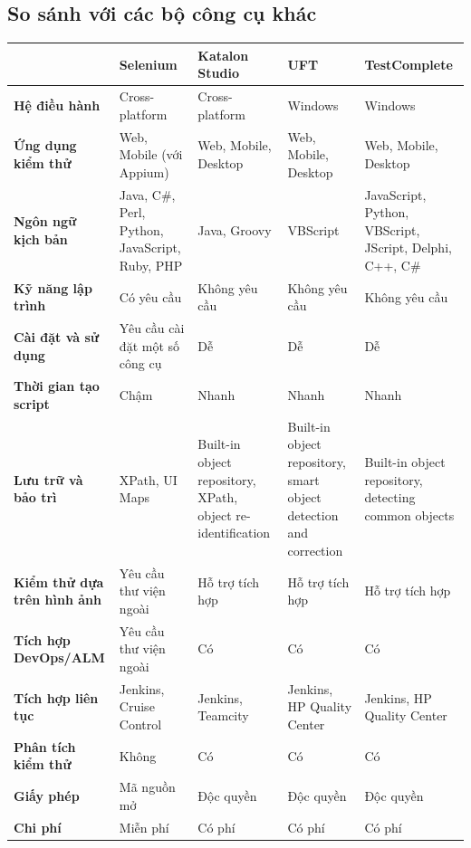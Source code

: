 \documentclass[./../main_file.tex]{subfiles}
\begin{document}
	\subsection{So sánh với các bộ công cụ khác}
	
	\begin{table}[H]
		\begin{tabular}{p{}p{}p{}p{}p{}}
			\hline
			\multicolumn{1}{l}{} & \textbf{Selenium} & \textbf{Katalon Studio} & \textbf{UFT} & \textbf{TestComplete} \\ \hline
			\textbf{Hệ điều hành} & Cross-platform & Cross-platform & Windows & Windows \\
			\textbf{Ứng dụng kiểm thử} & Web, Mobile (với Appium) & Web, Mobile, Desktop & Web, Mobile, Desktop & Web, Mobile, Desktop \\
			\textbf{Ngôn ngữ kịch bản} & Java, C\#, Perl, Python, JavaScript, Ruby, PHP & Java, Groovy & VBScript & JavaScript, Python, VBScript, JScript, Delphi, C++, C\# \\
			\textbf{Kỹ năng lập trình} & Có yêu cầu & Không yêu cầu & Không yêu cầu & Không yêu cầu \\
			\textbf{Cài đặt và sử dụng} & Yêu cầu cài đặt một số công cụ & Dễ & Dễ & Dễ \\
			\textbf{Thời gian tạo script} & Chậm & Nhanh & Nhanh & Nhanh \\
			\textbf{Lưu trữ và bảo trì} & XPath, UI Maps & Built-in object repository, XPath, object re-identification & Built-in object repository, smart object detection and correction & Built-in object repository, detecting common objects \\
			\textbf{Kiểm thử dựa trên hình ảnh} & Yêu cầu thư viện ngoài & Hỗ trợ tích hợp & Hỗ trợ tích hợp & Hỗ trợ tích hợp \\
			\textbf{Tích hợp DevOps/ALM} & Yêu cầu thư viện ngoài & Có & Có & Có \\
			\textbf{Tích hợp liên tục} & Jenkins, Cruise Control & Jenkins, Teamcity & Jenkins, HP Quality Center & Jenkins, HP Quality Center \\
			\textbf{Phân tích kiểm thử} & Không & Có & Có & Có \\
			\textbf{Giấy phép} & Mã nguồn mở & Độc quyền & Độc quyền & Độc quyền \\
			\textbf{Chi phí} & Miễn phí & Có phí & Có phí & Có phí \\ \hline
		\end{tabular}
	\end{table}
	
	
\end{document}
